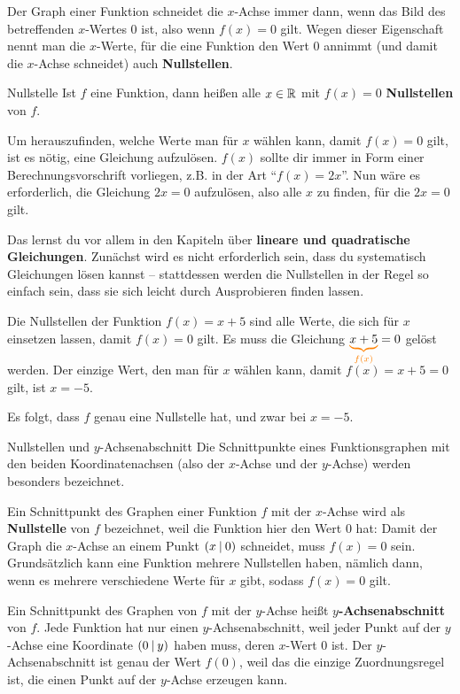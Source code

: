 \documentclass[../../main.tex]{subfiles}
\begin{document}
Der Graph einer Funktion schneidet die $x$-Achse immer dann, wenn das Bild des betreffenden $x$-Wertes $0$ ist, also wenn $f(x)=0$ gilt. Wegen dieser Eigenschaft nennt man die $x$-Werte, für die eine Funktion den Wert $0$ annimmt (und damit die $x$-Achse schneidet) auch \textbf{Nullstellen}.

\begin{definition}{Nullstelle}
    Ist $f$ eine Funktion, dann heißen alle $x\in\mathbb{R}$ mit $f(x)=0$ \textbf{Nullstellen} von $f$.
\end{definition}

Um herauszufinden, welche Werte man für $x$ wählen kann, damit $f(x)=0$ gilt, ist es nötig, eine Gleichung aufzulösen. $f(x)$ sollte dir immer in Form einer Berechnungsvorschrift vorliegen, z.B. in der Art \enquote{$f(x)=2x$}. Nun wäre es erforderlich, die Gleichung $2x=0$ aufzulösen, also alle $x$ zu finden, für die $2x=0$ gilt. 

Das lernst du vor allem in den Kapiteln über \textbf{lineare und quadratische Gleichungen}. Zunächst wird es nicht erforderlich sein, dass du systematisch Gleichungen lösen kannst -- stattdessen werden die Nullstellen in der Regel so einfach sein, dass sie sich leicht durch Ausprobieren finden lassen.

\begin{example}{}
    Die Nullstellen der Funktion $f(x)=x+5$ sind alle Werte, die sich für $x$ einsetzen lassen, damit $f(x)=0$ gilt. Es muss die Gleichung $\colorbrace{x+5}{f(x)}=0$ gelöst werden. Der einzige Wert, den man für $x$ wählen kann, damit $f(x)=x+5=0$ gilt, ist $x=-5$.
    
    Es folgt, dass $f$ genau eine Nullstelle hat, und zwar bei $x=-5$.
\end{example}

\begin{nutshell}{Nullstellen und $y$-Achsenabschnitt}
    Die Schnittpunkte eines Funktionsgraphen mit den beiden Koordinatenachsen (also der $x$-Achse und der $y$-Achse) werden besonders bezeichnet.
    
    Ein Schnittpunkt des Graphen einer Funktion $f$ mit der $x$-Achse wird als \textbf{Nullstelle} von $f$ bezeichnet, weil die Funktion hier den Wert 0 hat: Damit der Graph die $x$-Achse an einem Punkt $\left(x \:\middle|\: 0\right)$ schneidet, muss $f(x)=0$ sein. Grundsätzlich kann eine Funktion mehrere Nullstellen haben, nämlich dann, wenn es mehrere verschiedene Werte für $x$ gibt, sodass $f(x)=0$ gilt.
    
    Ein Schnittpunkt des Graphen von $f$ mit der $y$-Achse heißt \textbf{$y$-Achsenabschnitt} von $f$. Jede Funktion hat nur einen $y$-Achsenabschnitt, weil jeder Punkt auf der $y$-Achse eine Koordinate $\left(0 \:\middle|\: y\right)$ haben muss, deren $x$-Wert 0 ist. Der $y$-Achsenabschnitt ist genau der Wert $f(0)$, weil das die einzige Zuordnungsregel ist, die einen Punkt auf der $y$-Achse erzeugen kann.
\end{nutshell}
\end{document}
